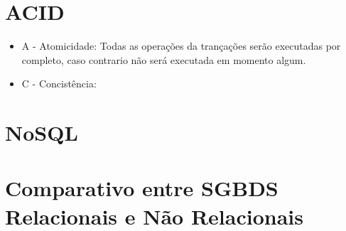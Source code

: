 \section{ACID}
  \begin{itemize}
    \item{ A - Atomicidade:
      Todas as operações da trançações serão executadas por completo, caso contrario não será executada em momento algum.
    }
    
    \item{ C - Concistência:
      
    }
  \end{itemize}

\section{NoSQL}

\section{Comparativo entre SGBDS Relacionais e Não Relacionais}
